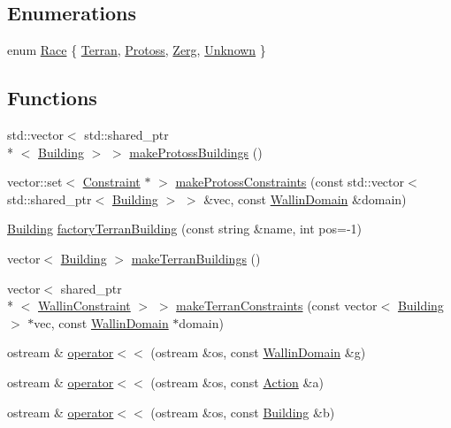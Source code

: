 \subsection*{Enumerations}
\begin{DoxyCompactItemize}
\item 
enum \hyperlink{namespaceghost_a8b1db75c40c6980adcf244ddccc0324b}{Race} \{ \hyperlink{namespaceghost_a8b1db75c40c6980adcf244ddccc0324ba83c1a2af1bdced3b37d96f507dea0ea4}{Terran}, 
\hyperlink{namespaceghost_a8b1db75c40c6980adcf244ddccc0324ba380e68da58f712ae9a02ded67517f6e5}{Protoss}, 
\hyperlink{namespaceghost_a8b1db75c40c6980adcf244ddccc0324ba95a952d94cc72ad754bcb37b1e16c221}{Zerg}, 
\hyperlink{namespaceghost_a8b1db75c40c6980adcf244ddccc0324ba900f1a9a96acbc80f0a573a909a21b01}{Unknown}
 \}
\end{DoxyCompactItemize}
\subsection*{Functions}
\begin{DoxyCompactItemize}
\item 
std\-::vector$<$ std\-::shared\-\_\-ptr\\*
$<$ \hyperlink{classghost_1_1Building}{Building} $>$ $>$ \hyperlink{namespaceghost_af3e32bb59f07ee561580978affe544bd}{make\-Protoss\-Buildings} ()
\item 
vector\-::set$<$ \hyperlink{classghost_1_1Constraint}{Constraint} $\ast$ $>$ \hyperlink{namespaceghost_a876b814af945577733c112c82d0423c3}{make\-Protoss\-Constraints} (const std\-::vector$<$ std\-::shared\-\_\-ptr$<$ \hyperlink{classghost_1_1Building}{Building} $>$ $>$ \&vec, const \hyperlink{classghost_1_1WallinDomain}{Wallin\-Domain} \&domain)
\item 
\hyperlink{classghost_1_1Building}{Building} \hyperlink{namespaceghost_a797dd3167189ccc913156ff624a7ad6a}{factory\-Terran\-Building} (const string \&name, int pos=-\/1)
\item 
vector$<$ \hyperlink{classghost_1_1Building}{Building} $>$ \hyperlink{namespaceghost_ade7cf14b6b46de3b038be9fb6c8afd82}{make\-Terran\-Buildings} ()
\item 
vector$<$ shared\-\_\-ptr\\*
$<$ \hyperlink{classghost_1_1WallinConstraint}{Wallin\-Constraint} $>$ $>$ \hyperlink{namespaceghost_af7fa3891f5f6563a142a99d3ab6b604b}{make\-Terran\-Constraints} (const vector$<$ \hyperlink{classghost_1_1Building}{Building} $>$ $\ast$vec, const \hyperlink{classghost_1_1WallinDomain}{Wallin\-Domain} $\ast$domain)
\item 
ostream \& \hyperlink{namespaceghost_a324a8e116f71d2eee57a356671330cc1}{operator$<$$<$} (ostream \&os, const \hyperlink{classghost_1_1WallinDomain}{Wallin\-Domain} \&g)
\item 
ostream \& \hyperlink{namespaceghost_a8126241ce5aea5db6c61184fa000a90f}{operator$<$$<$} (ostream \&os, const \hyperlink{classghost_1_1Action}{Action} \&a)
\item 
ostream \& \hyperlink{namespaceghost_a1e7e02c276d52eda961d841a47211933}{operator$<$$<$} (ostream \&os, const \hyperlink{classghost_1_1Building}{Building} \&b)
\end{DoxyCompactItemize}
